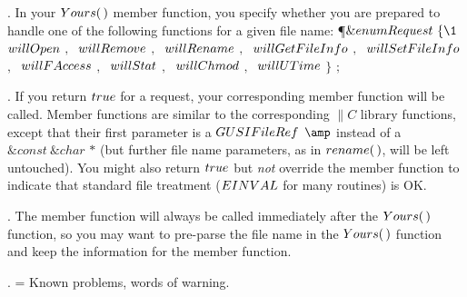 \fi

. In your \CD{}$\\{Yours}(\,)$\DC{} member function, you specify whether
you are prepared to handle
one of the following functions for a given file name:
\Y\P $\&{enum}\ \\{Request}\ \{\1$ $\\{willOpen}$ $,\;$ $\\{willRemove}$ $,\;$
$\\{willRename}$ $,\;$ $\\{willGetFileInfo}$ $,\;$ $\\{willSetFileInfo}$ $,\;$
$\\{willFAccess}$ $,\;$ $\\{willStat}$ $,\;$ $\\{willChmod}$ $,\;$ $%
\\{willUTime}$ $\}$ $;$\par
\fi

. If you return \CD{}$\\{true}$\DC{} for a request, your corresponding
member function will be called.
Member functions are similar to the corresponding \CD{}$\|C$\DC{} library
functions, except that
their first parameter is a \CD{}$\\{GUSIFileRef}$ $\amp$\DC{} instead of a %
\CD{}$\&{const}\ \&{char}$ ${*}$\DC{} (but further
file name parameters, as in \CD{}$\\{rename}(\,)$\DC{}, will be left
untouched). You might also return
\CD{}$\\{true}$\DC{} but {\it not} override the member function to indicate
that standard file treatment
(\CD{}$\\{EINVAL}$\DC{} for many routines) is OK.

\fi

. The member function will always be called immediately after the \CD{}$%
\\{Yours}(\,)$\DC{} function, so
you may want to pre-parse the file name in the \CD{}$\\{Yours}(\,)$\DC{}
function and keep the information
for the member function.

\fi

. = Known problems, words of warning. \medskip{}

